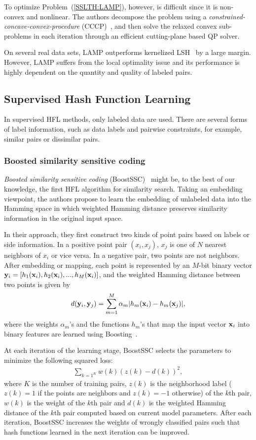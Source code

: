 To optimize Problem~(\ref{SSLTH:LAMP}), however, is difficult since it is non-convex and nonlinear. The authors decompose the problem using a \textit{constrained-concave-convex-procedure} (\mbox{CCCP})~\cite{yuille2001nips}, and then solve the relaxed convex sub-problems in each iteration through an efficient cutting-plane based \mbox{QP} solver.

On several real data sets, \mbox{LAMP} outperforms kernelized \mbox{LSH}~\cite{kulis2009iccv} by a large margin. However, \mbox{LAMP} suffers from the local optimality issue and its performance is highly dependent on the quantity and quality of labeled pairs.

\subsection{Supervised Hash Function Learning}
In supervised \mbox{HFL} methods, only labeled data are used. There are several forms of label information, such as data labels and pairwise constraints, for example, similar pairs or dissimilar pairs.

\subsubsection{Boosted similarity sensitive coding}
\textit{Boosted similarity sensitive coding} (\mbox{BoostSSC})~\cite{shakhnarovich2003iccv,shakhnarovich2005thesis} might be, to the best of our knowledge, the first \mbox{HFL} algorithm for similarity search. Taking an embedding viewpoint, the authors propose to learn the embedding of unlabeled data into the Hamming space in which weighted Hamming distance preserves similarity information in the original input space.

In their approach, they first construct two kinds of point pairs based on labels or side information. In a positive point pair $( x_i , x_j )$, $ x_j $ is one of $ N $ nearest neighbors of $ x_i $ or vice versa. In a negative pair, two points are not neighbors. After embedding or mapping, each point is represented by an $M$-bit binary vector ${\bf y}_i = [h_{1}({\bf x}_i), h_{2}({\bf x}_i), ..., h_{M}({\bf x}_i)]$, and the weighted Hamming distance between two points is given by $$d({\bf y}_i, {\bf y}_j) = \sum^{M}_{m=1}\alpha_{m}|h_{m}({\bf x}_i)-h_{m}({\bf x}_j)|,$$ where the weights $\alpha_{m}$'s and the functions $h_{m}$'s that map the input vector ${\bf x}_i$ into binary features are learned using Boosting~\cite{schapire1999ijcai,schapire1999mlj}.

At each iteration of the learning stage, \mbox{BoostSSC} selects the parameters to minimize the following squared loss:
\begin{align}
\sum\nolimits_{k=1}\nolimits^{K}w(k)(z(k)-d(k))^2,\nonumber
\end{align}
where $ K $ is the number of training pairs, $ z(k) $ is the neighborhood label ($ z(k) = 1 $ if the points are neighbors and $ z(k) = −1 $ otherwise) of the $ k $th pair, $ w(k) $ is the weight of the $ k $th pair and $ d(k) $ is the weighted Hamming distance of the $ k $th pair computed based on current model parameters. After each iteration, \mbox{BoostSSC} increases the weights of wrongly classified pairs such that hash functions learned in the next iteration can be improved.

